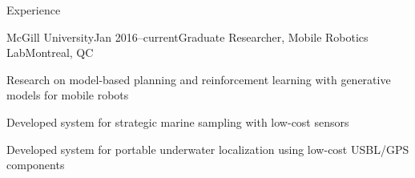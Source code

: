 \documentclass{resume} %
\begin{document}

\begin{rSection}{Experience}

\begin{rSubsection}{McGill University}{Jan 2016--current}{Graduate Researcher, Mobile Robotics Lab}{Montreal, QC}
\item{Research on model-based planning and reinforcement learning with generative models for mobile robots}
\item{Developed system for strategic marine sampling with low-cost sensors}
\item{Developed system for portable underwater localization using low-cost USBL/GPS components} 
\end{rSubsection}


\end{rSection}
\end{document}
